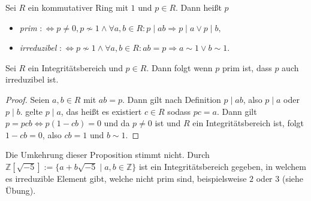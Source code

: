 \begin{definition}
    Sei $R$ ein kommutativer Ring mit $1$ und $p\in R$. Dann heißt $p$
    \begin{itemize}
        \item \emph{prim} $:\Leftrightarrow p\neq 0, p\not\sim 1\land \forall a,b\in R:p\mid ab\Rightarrow p\mid a\lor p\mid b,$
        \item \emph{irreduzibel} $:\Leftrightarrow p\not\sim 1\land \forall a,b\in R:ab=p\Rightarrow a\sim 1\lor b\sim 1.$
    \end{itemize}
\end{definition}

\begin{proposition}
    Sei $R$ ein Integritätsbereich und $p\in R$. Dann folgt wenn $p$ prim ist, dass $p$ auch irreduzibel ist.
\end{proposition}

\begin{proof}
    Seien $a,b\in R$ mit $ab=p$. Dann gilt nach Definition $p\mid ab$, also $p\mid a$ oder $p\mid b$.
    \obda gelte $p\mid a$, das heißt es existiert $c\in R$ sodass $pc=a$. Dann gilt $p=pcb\Leftrightarrow p(1-cb)=0$
    und da $p\neq 0$ ist und $R$ ein Integritätsbereich ist, folgt $1-cb=0$, also $cb=1$ und $b\sim 1$.
\end{proof}

\begin{example}
    Die Umkehrung dieser Proposition stimmt nicht.
    Durch $\mathbb{Z}[\sqrt{-5}] := \{a+b\sqrt{-5} \mid a,b \in \mathbb{Z}\}$ ist ein Integritätsbereich gegeben, in welchem es irreduzible Element
    gibt, welche nicht prim sind, beispielsweise $2$ oder $3$ (siehe Übung).
\end{example}